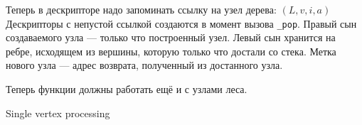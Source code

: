 \documentclass[12pt]{article}  %
\theoremstyle{definition}
\theoremstyle{remark}
\begin{document}
Теперь в дескрипторе надо запоминать ссылку на узел дерева: $(L, v, i, a)$
Дескрипторы с непустой ссылкой создаются в момент вызова \verb|_pop|. Правый сын создаваемого узла --- только что построенный узел. Левый сын хранится на ребре, исходящем из вершины, которую только что достали со стека.
Метка нового узла --- адрес возврата, полученный из достанного узла.

Теперь функции должны работать ещё и с узлами леса.

\begin{algorithm}[!ht]
\begin{algorithmic}[1]
\caption{Single vertex processing}
\label{processVertex}
  \EndIf
\EndFunction

      \EndFor
  \EndIf
\EndFunction

  \EndIf
      \EndFor
  \EndIf
\EndFunction

  \Else
  \EndIf
  \EndIf
\EndFunction


%


\end{algorithmic}
\end{algorithm}
\end{document}
